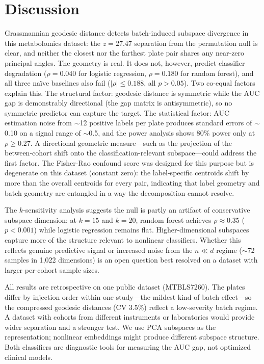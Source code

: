 \documentclass{article}
\begin{document}
\section{Discussion}
\label{sec:discussion}

Grassmannian geodesic distance detects batch-induced subspace divergence in this metabolomics dataset: the $z = 27.47$ separation from the permutation null is clear, and neither the closest nor the farthest plate pair shares any near-zero principal angles. The geometry is real. It does not, however, predict classifier degradation ($\rho = 0.040$ for logistic regression, $\rho = 0.180$ for random forest), and all three na\"{i}ve baselines also fail ($|\rho| \leq 0.188$, all $p > 0.05$). Two co-equal factors explain this. The structural factor: geodesic distance is symmetric while the AUC gap is demonstrably directional (the gap matrix is antisymmetric), so no symmetric predictor can capture the target. The statistical factor: AUC estimation noise from $\sim$12 positive labels per plate produces standard errors of $\sim$0.10 on a signal range of $\sim$0.5, and the power analysis shows 80\% power only at $\rho \geq 0.27$. A directional geometric measure---such as the projection of the between-cohort shift onto the classification-relevant subspace---could address the first factor. The Fisher-Rao confound score was designed for this purpose but is degenerate on this dataset (constant zero): the label-specific centroids shift by more than the overall centroids for every pair, indicating that label geometry and batch geometry are entangled in a way the decomposition cannot resolve.

The $k$-sensitivity analysis suggests the null is partly an artifact of conservative subspace dimension: at $k = 15$ and $k = 20$, random forest achieves $\rho \approx 0.35$ ($p < 0.001$) while logistic regression remains flat. Higher-dimensional subspaces capture more of the structure relevant to nonlinear classifiers. Whether this reflects genuine predictive signal or increased noise from the $n \ll d$ regime ($\sim$72 samples in 1{,}022 dimensions) is an open question best resolved on a dataset with larger per-cohort sample sizes.

All results are retrospective on one public dataset (MTBLS7260). The plates differ by injection order within one study---the mildest kind of batch effect---so the compressed geodesic distances (CV 3.5\%) reflect a low-severity batch regime. A dataset with cohorts from different instruments or laboratories would provide wider separation and a stronger test. We use PCA subspaces as the representation; nonlinear embeddings might produce different subspace structure. Both classifiers are diagnostic tools for measuring the AUC gap, not optimized clinical models.
\end{document}
